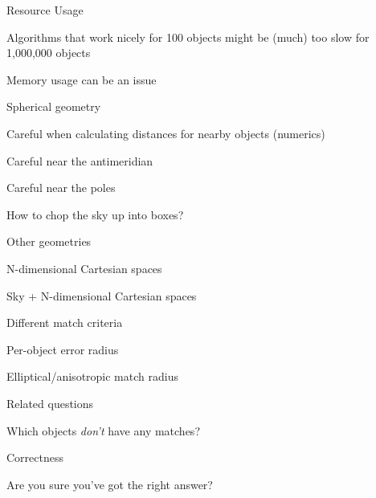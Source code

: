 \documentclass[20pt,landscape]{foils}
\begin{document}
\begin{list1}
\vspace*{-0.2cm}
  \item Resource Usage
\vspace*{-0.2cm}
  \begin{list2}
    \item Algorithms that work nicely for 100 objects might be
          (much) too slow for 1,000,000 objects
\vspace*{-0.1cm}
    \item Memory usage can be an issue
  \end{list2}
\vspace*{-0.2cm}
  \item Spherical geometry
\vspace*{-0.2cm}
  \begin{list2}
    \item Careful when calculating distances for nearby objects (numerics)
\vspace*{-0.1cm}
    \item Careful near the antimeridian
\vspace*{-0.1cm}
    \item Careful near the poles
\vspace*{-0.1cm}
    \item How to chop the sky up into boxes?
  \end{list2}
\vspace*{-0.2cm}
  \item Other geometries
\vspace*{-0.2cm}
  \begin{list2}
    \item N-dimensional Cartesian spaces
\vspace*{-0.1cm}
    \item Sky + N-dimensional Cartesian spaces
  \end{list2}
\vspace*{-0.2cm}
  \item Different match criteria
\vspace*{-0.2cm}
  \begin{list2}
    \item Per-object error radius
\vspace*{-0.1cm}
    \item Elliptical/anisotropic match radius
  \end{list2}
\vspace*{-0.2cm}
  \item Related questions
\vspace*{-0.2cm}
  \begin{list2}
    \item Which objects {\sl don't\/} have any matches?
  \end{list2}
\vspace*{-0.2cm}
  \item Correctness
\vspace*{-0.2cm}
  \begin{list2}
    \item Are you sure you've got the right answer?
  \end{list2}
\end{list1}
\end{document}
